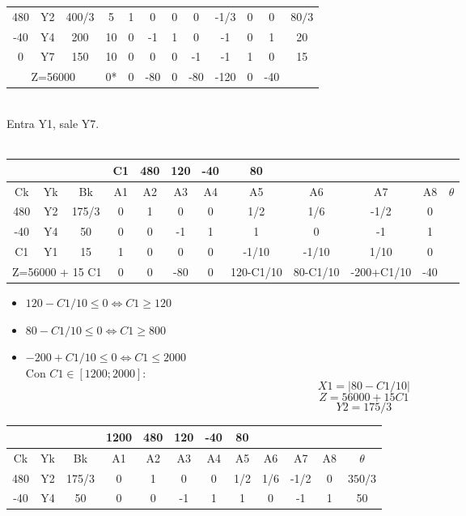 \documentclass{article}
\begin{document}
\begin{enumerate}
\begin{tabular}{|c  c  c | c  c  c  c  c  c  c  c | c |}
			 480 & Y2 & 400/3 & 5 & 1 & 0 & 0 & 0 & -1/3 & 0 & 0 & $80/3$\\
			 -40 & Y4 & 200 & 10 & 0 & -1 & 1 & 0 & -1 & 0 & 1 & 20\\
			 0 & Y7 & 150 & 10 & 0 & 0 & 0 & -1 & -1 & 1 & 0 & 15\\ \hline
			 \multicolumn{3}{|c|}{Z=56000} & 0* & 0 & -80 & 0 & -80 & -120 & 0 & -40 &\\ \hline
		\end{tabular}
		\medskip\\
		Entra Y1, sale Y7.\\ 
		\smallskip\\
		\begin{tabular}{|c  c  c | c  c  c  c  c  c  c  c | c |}
			\hline
			 \multicolumn{3}{|c|}{} & C1 & 480 & 120 & -40 & 80 & & & &\\ \hline
			 Ck & Yk & Bk & A1 & A2 & A3 & A4 & A5 & A6 & A7 & A8 & $\theta$\\ \hline 
			 480 & Y2 & 175/3 & 0 & 1 & 0 & 0 & 1/2 & 1/6 & -1/2 & 0 & \\
			 -40 & Y4 & 50 & 0 & 0 & -1 & 1 & 1 & 0 & -1 & 1 & \\
			 C1 & Y1 & 15 & 1 & 0 & 0 & 0 & -1/10 & -1/10 & 1/10 & 0 & \\ \hline
			 \multicolumn{3}{|c|}{Z=56000 + 15 C1} & 0 & 0 & -80 & 0 & 120-C1/10 & 80-C1/10 & -200+C1/10 & -40 &\\ \hline
		\end{tabular}
		\begin{itemize}
				\item $120 - C1/10 \leq 0 \iff C1 \geq 120$
				\item $80 - C1/10 \leq 0 \iff C1 \geq 800$
				\item $-200 + C1/10 \leq 0 \iff C1 \leq 2000$
					\smallskip\\
					Con $C1 \in [1200; 2000]$:\\
					$$X1 = |80 - C1/10|$$
					$$Z = 56000 + 15 C1$$
					$$Y2 = 175/3$$
		\end{itemize}
		\begin{tabular}{|c  c  c | c  c  c  c  c  c  c  c | c |}
			\hline
			 \multicolumn{3}{|c|}{} & 1200 & 480 & 120 & -40 & 80 & & & &\\ \hline
			 Ck & Yk & Bk & A1 & A2 & A3 & A4 & A5 & A6 & A7 & A8 & $\theta$\\ \hline 
			 480 & Y2 & 175/3 & 0 & 1 & 0 & 0 & 1/2 & 1/6 & -1/2 & 0 & $350/3$\\
			 -40 & Y4 & 50 & 0 & 0 & -1 & 1 & 1 & 0 & -1 & 1 & 50\\

\end{tabular}
\end{enumerate}
\end{document}
